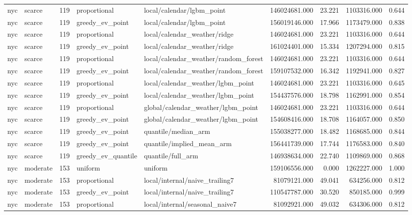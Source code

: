 \begin{tabular}{llrllrrrr}
nyc & scarce & 119 & proportional & local/calendar/lgbm\_point & 146024681.000 & 23.221 & 1103316.000 & 0.644 \\
nyc & scarce & 119 & greedy\_ev\_point & local/calendar/lgbm\_point & 156019146.000 & 17.966 & 1173479.000 & 0.838 \\
nyc & scarce & 119 & proportional & local/calendar\_weather/ridge & 146024681.000 & 23.221 & 1103316.000 & 0.644 \\
nyc & scarce & 119 & greedy\_ev\_point & local/calendar\_weather/ridge & 161024401.000 & 15.334 & 1207294.000 & 0.815 \\
nyc & scarce & 119 & proportional & local/calendar\_weather/random\_forest & 146024681.000 & 23.221 & 1103316.000 & 0.644 \\
nyc & scarce & 119 & greedy\_ev\_point & local/calendar\_weather/random\_forest & 159107532.000 & 16.342 & 1192941.000 & 0.827 \\
nyc & scarce & 119 & proportional & local/calendar\_weather/lgbm\_point & 146024681.000 & 23.221 & 1103316.000 & 0.645 \\
nyc & scarce & 119 & greedy\_ev\_point & local/calendar\_weather/lgbm\_point & 154437576.000 & 18.798 & 1162991.000 & 0.854 \\
nyc & scarce & 119 & proportional & global/calendar\_weather/lgbm\_point & 146024681.000 & 23.221 & 1103316.000 & 0.644 \\
nyc & scarce & 119 & greedy\_ev\_point & global/calendar\_weather/lgbm\_point & 154608416.000 & 18.708 & 1164057.000 & 0.850 \\
nyc & scarce & 119 & greedy\_ev\_point & quantile/median\_arm & 155038277.000 & 18.482 & 1168685.000 & 0.844 \\
nyc & scarce & 119 & greedy\_ev\_point & quantile/implied\_mean\_arm & 156441739.000 & 17.744 & 1176583.000 & 0.840 \\
nyc & scarce & 119 & greedy\_ev\_quantile & quantile/full\_arm & 146938634.000 & 22.740 & 1109869.000 & 0.868 \\
nyc & moderate & 153 & uniform & uniform & 159106556.000 & 0.000 & 1262227.000 & 1.000 \\
nyc & moderate & 153 & proportional & local/internal/naive\_trailing7 & 81079121.000 & 49.041 & 634256.000 & 0.812 \\
nyc & moderate & 153 & greedy\_ev\_point & local/internal/naive\_trailing7 & 110547787.000 & 30.520 & 850185.000 & 0.999 \\
nyc & moderate & 153 & proportional & local/internal/seasonal\_naive7 & 81092921.000 & 49.032 & 634306.000 & 0.812 \\

\end{tabular}
